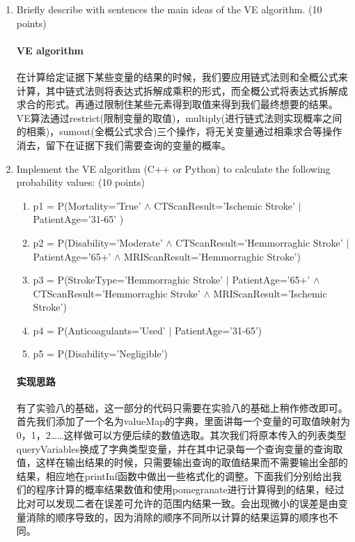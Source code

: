 \documentclass[a4paper, 11pt]{article}
\begin{document}
\begin{enumerate}
\item Briefly describe with sentences the main ideas of  the VE algorithm. (10 points)
\paragraph{VE algorithm}
在计算给定证据下某些变量的结果的时候，我们要应用链式法则和全概公式来计算，其中链式法则将表达式拆解成乘积的形式，而全概公式将表达式拆解成求合的形式。再通过限制住某些元素得到取值来得到我们最终想要的结果。VE算法通过restrict(限制变量的取值)，multiply(进行链式法则实现概率之间的相乘)，sumout(全概公式求合)三个操作，将无关变量通过相乘求合等操作消去，留下在证据下我们需要查询的变量的概率。

\item Implement the VE algorithm (C++ or Python) to calculate the following probability values: (10 points)
    
\begin{enumerate}
\item p1 = P(Mortality='True' $\land$ CTScanResult='Ischemic Stroke' $|$ PatientAge='31-65' )

\item p2 = P(Disability='Moderate' $\land$ CTScanResult='Hemmorraghic Stroke' $|$ PatientAge='65+' $\land$  MRIScanResult='Hemmorraghic Stroke')

\item p3 = P(StrokeType='Hemmorraghic Stroke' $|$ PatientAge='65+' $\land$ CTScanResult='Hemmorraghic Stroke' $\land$ MRIScanResult='Ischemic Stroke')

\item p4 = P(Anticoagulants='Used' $|$ PatientAge='31-65')

\item p5 = P(Disability='Negligible')
\end{enumerate}

\paragraph{实现思路}
有了实验八的基础，这一部分的代码只需要在实验八的基础上稍作修改即可。首先我们添加了一个名为valueMap的字典，里面讲每一个变量的可取值映射为0，1，2……这样做可以方便后续的数值选取。其次我们将原本传入的列表类型queryVariables换成了字典类型变量，并在其中记录每一个查询变量的查询取值，这样在输出结果的时候，只需要输出查询的取值结果而不需要输出全部的结果，相应地在printInf函数中做出一些格式化的调整。下面我们分别给出我们的程序计算的概率结果数值和使用pomegranate进行计算得到的结果，经过比对可以发现二者在误差可允许的范围内结果一致。会出现微小的误差是由变量消除的顺序导致的，因为消除的顺序不同所以计算的结果运算的顺序也不同。


\end{enumerate}
\end{document}
